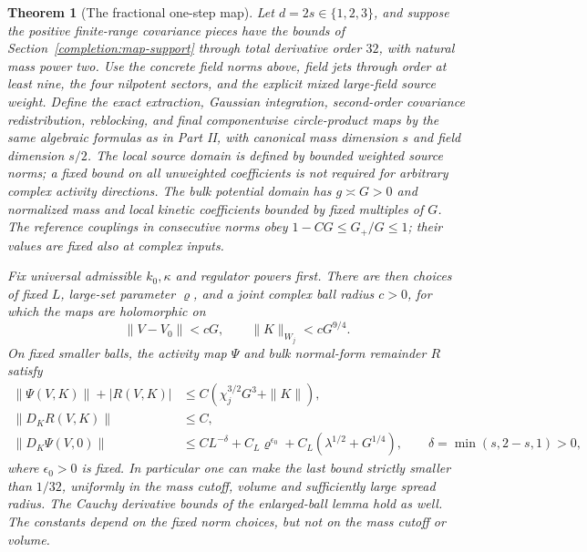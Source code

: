 \documentclass[11pt]{article}
\newtheorem{theorem}{Theorem}
\begin{document}
\begin{theorem}[The fractional one-step map]
\label{completion:map-theorem}
Let \(d=2s\in\{1,2,3\}\), and suppose the positive finite-range
covariance pieces have the bounds of Section~\ref{completion:map-support}
through total derivative order \(32\), with natural mass power two.
Use the concrete field norms above, field jets through order at least
nine, the four nilpotent sectors, and the explicit mixed large-field
source weight. Define the exact extraction, Gaussian integration,
second-order covariance redistribution, reblocking, and final
componentwise circle-product maps by the same algebraic formulas as
in Part II, with canonical mass dimension \(s\) and field dimension
\(s/2\). The local source domain is defined by bounded weighted source norms;
a fixed bound on all unweighted coefficients is not required for arbitrary
complex activity directions. The bulk potential domain has \(g\asymp G>0\) and normalized
mass and local kinetic coefficients bounded by fixed multiples of
\(G\). The reference couplings in consecutive norms obey
\(1-CG\le G_+/G\le1\); their values are fixed also at complex inputs.

Fix universal admissible \(k_0,\kappa\) and regulator powers first.
There are then choices of fixed \(L\), large-set parameter
\(\varrho\), and a joint complex ball radius \(c>0\),
for which the maps are holomorphic on
\[
 \|V-V_0\|<cG,\qquad \|K\|_{W_j}<cG^{9/4}.
\]
On fixed smaller balls, the activity map \(\Psi\) and bulk normal-form
remainder \(R\) satisfy
\begin{align*}
 \|\Psi(V,K)\|+|R(V,K)|
      &\le C(\chi_j^{3/2}G^3+\|K\|),\\
 \|D_KR(V,K)\|&\le C,\\
 \|D_K\Psi(V,0)\|
      &\le CL^{-\delta}+C_L\varrho^{\epsilon_0}
                     +C_L(\lambda^{1/2}+G^{1/4}),
       \qquad \delta=\min(s,2-s,1)>0,
\end{align*}
where \(\epsilon_0>0\) is fixed. In particular one can make the last
bound strictly smaller than \(1/32\), uniformly in the mass cutoff,
volume and sufficiently large spread radius. The Cauchy derivative
bounds of the enlarged-ball lemma hold as well. The constants depend
on the fixed norm choices, but not on the mass cutoff or volume.
\end{theorem}
\end{document}

